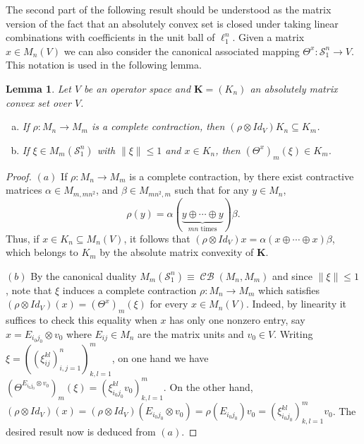 \documentclass[11pt]{amsart}
\DeclareMathOperator{\CB}{\mathcal{CB}}
\newcommand{\n}[1]{ \left\|#1\right\| }
\newtheorem{lemma}[theorem]{Lemma}
\numberwithin{equation}{section}
\begin{document}
The second part of the following result should be understood as the matrix version of the fact that an absolutely convex set is closed under taking linear combinations with coefficients in the unit ball of $\ell_1^n$.
Given a matrix $x \in M_n(V)$ we can also consider the canonical associated mapping $\Theta^x : \mathcal{S}_1^n \to V$. This notation is used in the following lemma.

\begin{lemma}\label{lemma:abs-matrix-convex-properties}
Let $V$ be an operator space and $\mathbf{K} = (K_n)$ an absolutely matrix convex  set over $V$.
\begin{enumerate}[(a)]
\item If $\rho : M_n \to M_m$ is a complete contraction, then $(\rho \otimes Id_V) K_n \subseteq K_m$.
\item If $\xi \in M_m(\mathcal{S}_1^n)$ with $\n{\xi} \le 1$ and $x \in K_n$, then
$(\Theta^x)_m(\xi) \in K_m$.
\end{enumerate}
\end{lemma}

\begin{proof}
$(a)$ If $\rho : M_n \to M_m$ is a complete contraction, by \cite[Cor. 5.3.5 (i)]{Effros-Ruan-book} there exist contractive matrices $\alpha \in M_{m,mn^2}$, and $\beta \in M_{mn^2,m}$ such that for any $y \in M_n$,
\begin{equation}\label{eqn-Stinespring}
\rho(y) = \alpha( \underbrace{y \oplus \cdots \oplus y}_{mn \text{ times}} )\beta.    
\end{equation}
 Thus, if $x \in K_n \subseteq M_n(V)$, it follows that $(\rho \otimes Id_V) x = \alpha( {x \oplus \cdots \oplus x} )\beta$, which belongs to $K_m$ by the absolute matrix convexity of $\mathbf{K}$.
 
 $(b)$ By the canonical duality $M_m(\mathcal{S}_1^n) \equiv \CB(M_n, M_m)$ and since $\n{\xi} \le 1$, note that $\xi$ induces a complete contraction ${\rho : M_n \to M_m}$ 
 which satisfies $(\rho\otimes Id_V)(x) = (\Theta^x)_m(\xi)$ for every $x \in M_n(V)$.
Indeed, by linearity it suffices to check this equality when $x$ has only one nonzero entry, say $x = E_{i_0j_0} \otimes v_0$ where $E_{ij} \in M_n$ are the matrix units and $v_0 \in V$.
Writing $\xi = ( (\xi^{kl}_{ij})_{i,j=1}^n )_{k,l=1}^m$, on one hand we have $(\Theta^{E_{i_0j_0} \otimes v_0})_m(\xi) = (\xi^{kl}_{i_0j_0}v_0)_{k,l=1}^m$.
On the other hand, $(\rho\otimes Id_V)(x) = (\rho\otimes Id_V)( E_{i_0j_0} \otimes v_0 ) = \rho(E_{i_0j_0}) v_0 = (\xi^{kl}_{i_0j_0})_{k,l=1}^mv_0$.
 The desired result now is deduced from $(a)$.
\end{proof}
\end{document}
